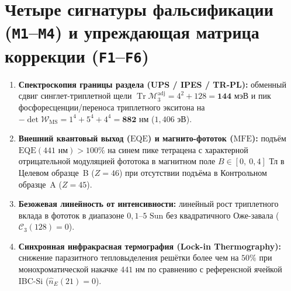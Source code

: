\section{Четыре сигнатуры фальсификации (\texttt{M1}--\texttt{M4}) и упреждающая матрица коррекции (\texttt{F1}--\texttt{F6})}

\begin{enumerate}[label=\textbf{(M\arabic*)},leftmargin=*]
\item \textbf{Спектроскопия границы раздела (UPS / IPES / TR-PL):} обменный сдвиг синглет-триплетной щели $\operatorname{Tr}\mathcal{M}_3^{\mathrm{adj}} = 4^2 + 128 = \mathbf{144\text{ мэВ}}$ и пик фосфоресценции/переноса триплетного экситона на $-\det\mathcal{W}_{\mathrm{MS}} = 1^4 + 5^4 + 4^4 = \mathbf{882\text{ нм}}$ ($1{,}406\text{ эВ}$).
\item \textbf{Внешний квантовый выход ($\mathrm{EQE}$) и магнито-фототок ($\mathrm{MFE}$):} подъём $\mathrm{EQE}(441\text{ нм}) > 100\%$ на синем пике тетрацена с характерной отрицательной модуляцией фототока в магнитном поле $B \in [0,\ 0{,}4]\text{ Тл}$ в Целевом образце~B ($Z=46$) при отсутствии подъёма в Контрольном образце~A ($Z=45$).
\item \textbf{Безожевая линейность от интенсивности:} линейный рост триплетного вклада в фототок в диапазоне $0{,}1\text{--}5\text{ Sun}$ без квадратичного Оже-завала ($\mathcal{C}_3(128) = 0$).
\item \textbf{Синхронная инфракрасная термография (Lock-in Thermography):} снижение паразитного тепловыделения решётки более чем на $50\%$ при монохроматической накачке $441\text{ нм}$ по сравнению с референсной ячейкой IBC-$\mathrm{Si}$ ($\hat{n}_E(21) = 0$).
\end{enumerate}

